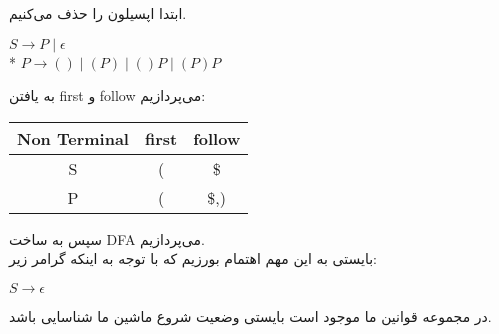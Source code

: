 
ابتدا اپسیلون را حذف می‌کنیم.

\begin{center}
$S \rightarrow P \; | \; \epsilon$
\\*
$P \rightarrow () \; | \; (P) \; | \; ()P \; | \; (P)P$
\end{center}
به یافتن first و follow می‌پردازیم:

\begin{center}
    \begin{latin}
        \begin{tabular}{|c|c|c|}
            \hline
            Non Terminal & first & follow \\ \hline
            S            & (     & \$     \\ \hline
            P            & (     & \$,)  \\ \hline
        \end{tabular}
    \end{latin}
\end{center}

سپس به ساخت DFA می‌پردازیم.
\\
بایستی به این مهم اهتمام بورزیم که با توجه به اینکه گرامر زیر:

\begin{center}
$S \rightarrow  \epsilon$
\end{center}

در مجموعه قوانین ما موجود است بایستی وضعیت شروع ماشین ما شناسایی باشد.
\\




